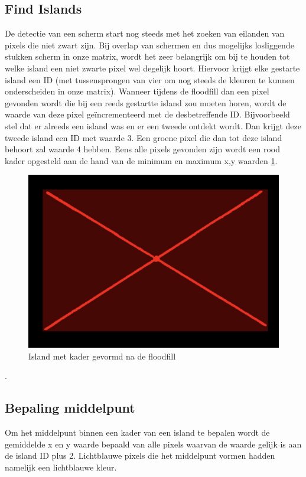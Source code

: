 \subsection{Find Islands}
De detectie van een scherm start nog steeds met het zoeken van eilanden van pixels die niet zwart zijn. Bij overlap van schermen en dus mogelijks losliggende stukken scherm in onze matrix, wordt het zeer belangrijk om bij te houden tot welke island een niet zwarte pixel wel degelijk hoort. Hiervoor krijgt elke gestarte island een ID (met tussensprongen van vier om nog steeds de kleuren te kunnen onderscheiden in onze matrix). Wanneer tijdens de floodfill \cite{floodfill} dan een pixel gevonden wordt die bij een reeds gestartte island zou moeten horen, wordt de waarde van deze pixel geïncrementeerd met de desbetreffende ID. Bijvoorbeeld stel dat er alreeds een island was en er een tweede ontdekt wordt. Dan krijgt deze tweede island een ID met waarde 3. Een groene pixel die dan tot deze island behoort zal waarde 4 hebben. Eens alle pixels gevonden zijn wordt een rood kader opgesteld aan de hand van de minimum en maximum x,y waarden \ref{fig:island}.

\begin{figure} [h]
	\center
	\includegraphics[width=\textwidth]{island}
	\caption{Island met kader gevormd na de floodfill}
	\label{fig:island}
\end{figure}.

\subsection{Bepaling middelpunt}
Om het middelpunt binnen een kader van een island te bepalen wordt de gemiddelde x en y waarde bepaald van alle pixels waarvan de waarde gelijk is aan de island ID plus 2. Lichtblauwe pixels die het middelpunt vormen hadden namelijk een lichtblauwe kleur.

